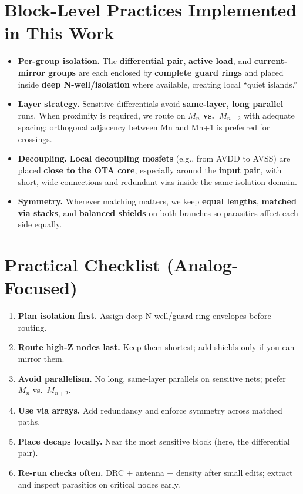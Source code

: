 \documentclass[
  11pt,
  a4paper,
  oneside]{scrbook}
\providecommand{\tightlist}{%
  \setlength{\itemsep}{0pt}\setlength{\parskip}{0pt}}
\begin{document}
\section{Block-Level Practices Implemented in This
Work}\label{block-level-practices-implemented-in-this-work}

\begin{itemize}
\tightlist
\item
  \textbf{Per-group isolation.} The \textbf{differential pair},
  \textbf{active load}, and \textbf{current-mirror groups} are each
  enclosed by \textbf{complete guard rings} and placed inside
  \textbf{deep N-well/isolation} where available, creating local ``quiet
  islands.''\\
\item
  \textbf{Layer strategy.} Sensitive differentials avoid
  \textbf{same-layer, long parallel} runs. When proximity is required,
  we route on \textbf{\(M_n\) vs.~\(M_{n+2}\)} with adequate spacing;
  orthogonal adjacency between Mn and Mn+1 is preferred for crossings.\\
\item
  \textbf{Decoupling.} \textbf{Local decoupling mosfets} (e.g., from
  AVDD to AVSS) are placed \textbf{close to the OTA core}, especially
  around the \textbf{input pair}, with short, wide connections and
  redundant vias inside the same isolation domain.\\
\item
  \textbf{Symmetry.} Wherever matching matters, we keep \textbf{equal
  lengths}, \textbf{matched via stacks}, and \textbf{balanced shields}
  on both branches so parasitics affect each side equally.
\end{itemize}

\section{Practical Checklist
(Analog-Focused)}\label{practical-checklist-analog-focused}

\begin{enumerate}
\def\labelenumi{\arabic{enumi}.}
\tightlist
\item
  \textbf{Plan isolation first.} Assign deep-N-well/guard-ring envelopes
  before routing.\\
\item
  \textbf{Route high-Z nodes last.} Keep them shortest; add shields only
  if you can mirror them.\\
\item
  \textbf{Avoid parallelism.} No long, same-layer parallels on sensitive
  nets; prefer \(M_n\) vs.~\(M_{n+2}\).\\
\item
  \textbf{Use via arrays.} Add redundancy and enforce symmetry across
  matched paths.\\
\item
  \textbf{Place decaps locally.} Near the most sensitive block (here,
  the differential pair).\\
\item
  \textbf{Re-run checks often.} DRC + antenna + density after small
  edits; extract and inspect parasitics on critical nodes early.
\end{enumerate}
\end{document}
